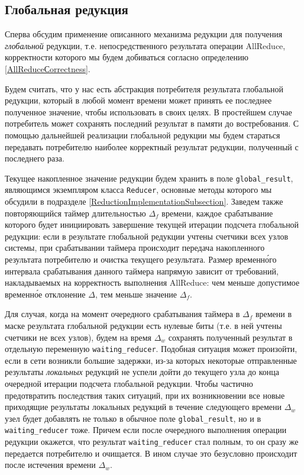 \documentclass{article}
\theoremstyle{plain}
\theoremstyle{plain}
\theoremstyle{plain}
\theoremstyle{plain}
\theoremstyle{definition}
\theoremstyle{remark}
\theoremstyle{plain}
\begin{document}
\subsection{Глобальная редукция}
\label{GlobalReductionsSubection}

Сперва обсудим применение описанного механизма редукции для получения \textit{глобальной} редукции, т.е. непосредственного результата операции AllReduce, корректности которого мы будем добиваться согласно определению \ref{AllReduceСorrectness}.

Будем считать, что у нас есть абстракция потребителя результата глобальной редукции, который в любой момент времени может принять ее последнее полученное значение, чтобы использовать в своих целях. В простейшем случае потребитель может сохранять последний результат в памяти до востребования. С помощью дальнейшей реализации глобальной редукции мы будем стараться передавать потребителю наиболее корректный результат редукции, полученный с последнего раза.

Текущее накопленное значение редукции будем хранить в поле \texttt{global\_result}, являющимся экземпляром класса \texttt{Reducer}, основные методы которого мы обсудили в подразделе \ref{ReductionImplementationSubsection}. Заведем также повторяющийся таймер длительностью $\Delta_f$ времени, каждое срабатывание которого будет инициировать завершение текущей итерации подсчета глобальной редукции: если в результате глобальной редукции учтены счетчики всех узлов системы, при срабатывании таймера происходит передача накопленного результата потребителю и очистка текущего результата. Размер временн\'{о}го интервала срабатывания данного таймера напрямую зависит от требований, накладываемых на корректность выполнения AllReduce: чем меньше допустимое временн\'{о}е отклонение $\Delta$, тем меньше значение $\Delta_f$.

Для случая, когда на момент очередного срабатывания таймера в $\Delta_f$ времени в маске результата глобальной редукции есть нулевые биты (т.е. в ней учтены счетчики не всех узлов), будем на время $\Delta_w$ сохранять полученный результат в отдельную переменную \texttt{waiting\_reducer}. Подобная ситуация может произойти, если в сети возникли большие задержки, из-за которых некоторые отправленные результаты \textit{локальных} редукций не успели дойти до текущего узла до конца очередной итерации подсчета глобальной редукции. Чтобы частично предотвратить последствия таких ситуаций, при их возникновении все новые приходящие результаты локальных редукций в течение следующего времени $\Delta_w$ узел будет добавлять не только в обычное поле \texttt{global\_result}, но и в \texttt{waiting\_reducer} тоже. Причем если после очередного выполнения операции редукции окажется, что результат \texttt{waiting\_reducer} стал полным, то он сразу же передается потребителю и очищается. В ином случае это безусловно происходит после истечения времени $\Delta_w$.
\end{document}
